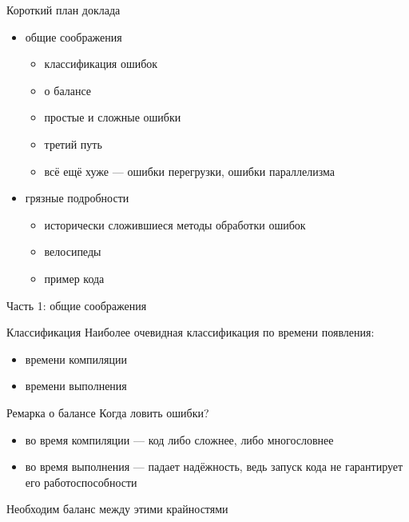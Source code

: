 \documentclass[10pt]{beamer}
\begin{document}
\begin{frame}{Короткий план доклада}
  \begin{itemize}
  \item общие соображения
    \begin{itemize}
    \item классификация ошибок
    \item о балансе
    \item простые и сложные ошибки
    \item третий путь
    \item всё ещё хуже — ошибки перегрузки, ошибки параллелизма
    \end{itemize}
  \item грязные подробности
    \begin{itemize}
    \item исторически сложившиеся методы обработки ошибок
    \item велосипеды
    \item пример кода
    \end{itemize}
  \end{itemize}
\end{frame}

\begin{frame}{}
  \begin{center}
    \huge Часть 1: общие соображения
  \end{center}
\end{frame}

\begin{frame}{Классификация}
  Наиболее очевидная классификация по времени появления:
  \begin{itemize}
  \item времени компиляции
  \item времени выполнения
  \end{itemize}
\end{frame}

\begin{frame}{Ремарка о балансе}
  Когда ловить ошибки?
  \begin{itemize}
  \item во время компиляции — код либо сложнее, либо многословнее
  \item во время выполнения — падает надёжность, ведь запуск кода не гарантирует его работоспособности
  \end{itemize}
  Необходим баланс между этими крайностями
\end{frame}
\end{document}

